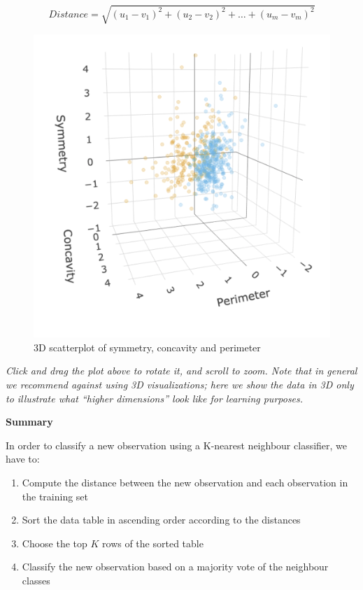 \documentclass[
]{krantz}
\providecommand{\tightlist}{%
  \setlength{\itemsep}{0pt}\setlength{\parskip}{0pt}}
\begin{document}
\[Distance = \sqrt{(u_{1} -v_{1})^2 + (u_{2} - v_{2})^2 + \dots + (u_{m} - v_{m})^2}\]

\begin{figure}
\includegraphics[width=1\linewidth]{img/classification_3d} \caption{3D scatterplot of symmetry, concavity and perimeter}\label{fig:05-more}
\end{figure}

\emph{Click and drag the plot above to rotate it, and scroll to zoom. Note that in
general we recommend against using 3D visualizations; here we show the data in
3D only to illustrate what ``higher dimensions'' look like for learning
purposes.}

\textbf{Summary}

In order to classify a new observation using a K-nearest neighbour classifier, we have to:

\begin{enumerate}
\def\labelenumi{\arabic{enumi}.}
\tightlist
\item
  Compute the distance between the new observation and each observation in the training set
\item
  Sort the data table in ascending order according to the distances
\item
  Choose the top \(K\) rows of the sorted table
\item
  Classify the new observation based on a majority vote of the neighbour classes
\end{enumerate}
\end{document}
